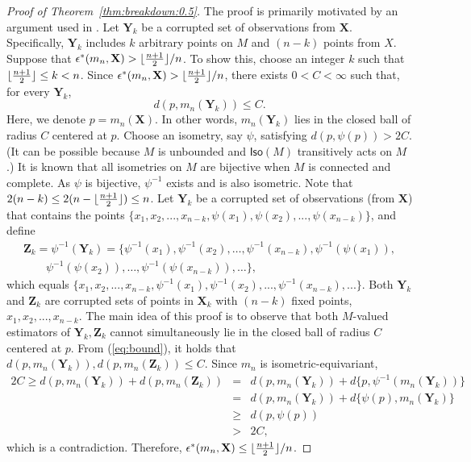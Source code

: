\documentclass[preprint]{imsart}
\DeclarePairedDelimiter\floor{\lfloor}{\rfloor}
\newcommand{\bX}{\mathbf{X}}
\newcommand{\bY}{\mathbf{Y}}
\newcommand{\bZ}{\mathbf{Z}}
\theoremstyle{plain}
\theoremstyle{remark}
\begin{document}
\begin{appendix}
\begin{proof}[Proof of Theorem~\ref{thm:breakdown:0.5}]
The proof is primarily motivated by an argument used in \citep[Theorem 2.1,][]{lopuhaa1991breakdown}. Let $\bY_{k}$ be a corrupted set of observations from $\bX$. Specifically, $\bY_{k}$ includes $k$ arbitrary points on $M$ and $(n-k)$ points from $X$. Suppose that $\epsilon^{*}(m_n, \bX) > \floor{\frac{n+1}{2}}/n$. To show this, choose an integer $k$ such that $\floor{\frac{n+1}{2}} \le k < n$. Since $\epsilon^{*}(m_n, \bX) > \floor{\frac{n+1}{2}}/n$, there exists $0 < C < \infty$ such that, for every $\bY_{k}$,
\begin{equation}\label{eq:bound}
d(p, m_{n}(\bY_k)) \le C. 
\end{equation}
Here, we denote $p=m_{n}(\bX)$. In other words, $m_{n}(\mathbf{Y}_{k})$ lies in the closed ball of radius $C$ centered at $p$. Choose an isometry, say $\psi$, satisfying $d(p, \psi(p)) > 2C$. (It can be possible because $M$ is unbounded and $\textsf{Iso}(M)$ transitively acts on $M$.) It is known that all isometries on $M$ are bijective when $M$ is connected and complete. As $\psi$ is bijective, $\psi^{-1}$ exists and is also isometric. Note that $2(n-k) \le 2(n-\floor{\frac{n+1}{2}}) \le n$. Let $\bY_{k}$ be a corrupted set of observations (from $\bX$) that contains the points $\{x_{1}, x_{2}, ..., x_{n-k}, \psi(x_{1}), \psi(x_{2}), ..., \psi(x_{n-k})\}$, and define 
\begin{eqnarray*}
\bZ_{k} = \psi^{-1}(\bY_{k}) = \{\psi^{-1}(x_{1}), \psi^{-1}(x_{2}), \ldots, \psi^{-1}(x_{n-k}), \psi^{-1}(\psi(x_{1})), \\  
\qquad \psi^{-1}(\psi(x_{2})), \ldots, \psi^{-1}(\psi(x_{n-k})), \ldots \},
\end{eqnarray*}
which equals $\{x_{1}, x_{2}, ..., x_{n-k}, \psi^{-1}(x_{1}), \psi^{-1}(x_{2}), ..., \psi^{-1}(x_{n-k}), ... \}$. Both $\bY_{k}$ and $\bZ_{k}$ are corrupted sets of points in $\bX_{k}$ with $(n-k)$ fixed points, $x_{1}, x_{2}, ..., x_{n-k}$. The main idea of this proof is to observe that both $M$-valued estimators of $\mathbf{Y}_{k}, \mathbf{Z}_{k}$ cannot simultaneously lie in the closed ball of radius $C$ centered at $p$. From (\ref{eq:bound}), it holds that $d(p, m_{n}(\bY_{k})), d(p, m_{n}(\bZ_{k})) \le C$. Since $m_{n}$ is isometric-equivariant,
\begin{eqnarray*}
2C \ge d(p, m_{n}(\bY_{k})) + d(p, m_{n}(\bZ_{k})) &=& d(p, m_{n}(\bY_{k})) + d\{p, \psi^{-1}(m_{n}(\bY_{k}))\}  \\
&=& d(p, m_{n}(\bY_{k})) + d\{\psi(p), m_{n}(\bY_{k})\} \\
&\ge& d(p, \psi(p)) \\
&>& 2C,
\end{eqnarray*}
which is a contradiction. Therefore, $\epsilon^{*}(m_{n}, \bX) \le \floor{\frac{n+1}{2}}/n$.
\end{proof}




\end{appendix}
\end{document}

